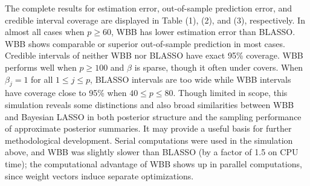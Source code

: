 \documentclass[12pt]{TD-CJS}
\begin{document}

The complete results for estimation error,  out-of-sample prediction error, and credible interval coverage are displayed in Table (1), (2), and (3), respectively. In almost all cases when $p\geq 60$, WBB has lower estimation error than BLASSO. 
WBB shows comparable or superior out-of-sample prediction in most cases. 
 Credible intervals of neither WBB nor BLASSO have exact 95\% coverage.  WBB performs well when $p \geq 100$ and $\beta$ is sparse, though it often under covers.  When $\beta_j = 1$ for all $1 \leq j \leq p$, BLASSO intervals are too wide while WBB intervals have coverage close to 95\% when $40 \leq p \leq 80$.    Though limited in scope, this simulation reveals some distinctions
and also  broad similarities between WBB and Bayesian LASSO in both posterior structure and the sampling performance of approximate posterior summaries. It may provide
a useful basis for further methodological development.  Serial computations were used in the simulation above, and
WBB was  slightly slower than BLASSO  (by a factor of 1.5 on CPU time);  the computational advantage of WBB shows up in
parallel computations, since weight vectors induce separate optimizations. 
\end{document}

